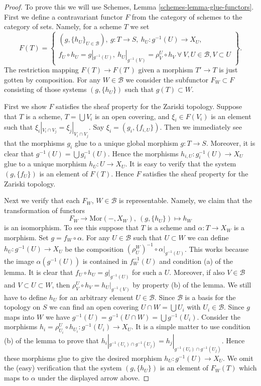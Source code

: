 \begin{proof}
To prove this we will use Schemes, Lemma \ref{schemes-lemma-glue-functors}.
First we define a contravariant functor $F$ from the category of schemes
to the category of sets. Namely, for a scheme $T$ we set
$$
F(T) =
\left\{
\begin{matrix}
(g, \{h_U\}_{U \in \mathcal{B}}), \ 
g : T \to S, \ h_U : g^{-1}(U) \to X_U, \\
f_U \circ h_U = g|_{g^{-1}(U)}, \ 
h_U|_{g^{-1}(V)} = \rho^U_V \circ h_V\ 
\forall\ V, U \in \mathcal{B}, V \subset U
\end{matrix}
\right\}.
$$
The restriction mapping $F(T) \to F(T')$ given a morphism
$T' \to T$ is just gotten by composition.
For any $W \in \mathcal{B}$ we consider the subfunctor
$F_W \subset F$ consisting of those systems $(g, \{h_U\})$
such that $g(T) \subset W$.

\medskip\noindent
First we show $F$ satisfies the sheaf property for the Zariski topology.
Suppose that $T$ is a scheme, $T = \bigcup V_i$ is an open covering,
and $\xi_i \in F(V_i)$ is an element such that
$\xi_i|_{V_i \cap V_j} = \xi_j|_{V_i \cap V_j}$.
Say $\xi_i = (g_i, \{f_{i, U}\})$. Then we immediately see that
the morphisms $g_i$ glue to a unique global morphism
$g : T \to S$. Moreover, it is clear that
$g^{-1}(U) = \bigcup g_i^{-1}(U)$. Hence the morphisms
$h_{i, U} : g_i^{-1}(U) \to X_U$ glue to a unique morphism
$h_U : U \to X_U$. It is easy to verify that the system
$(g, \{f_U\})$ is an element of $F(T)$. Hence $F$ satisfies the
sheaf property for the Zariski topology.

\medskip\noindent
Next we verify that each $F_W$, $W \in \mathcal{B}$ is representable.
Namely, we claim that the transformation of functors
$$
F_W \longrightarrow \text{Mor}(-, X_W), \ (g, \{h_U\}) \longmapsto h_W
$$
is an isomorphism. To see this suppose that $T$ is a scheme and
$\alpha : T \to X_W$ is a morphism. Set $g = f_W \circ \alpha$.
For any $U \in \mathcal{B}$ such that $U \subset W$ we can
define $h_U : g^{-1}(U) \to X_U$ be the composition
$(\rho^W_U)^{-1} \circ \alpha|_{g^{-1}(U)}$. This works because
the image $\alpha(g^{-1}(U))$ is contained in $f_W^{-1}(U)$ and
condition (a) of the lemma. It is clear that
$f_U \circ h_U = g|_{g^{-1}(U)}$ for such a $U$.
Moreover, if also $V \in \mathcal{B}$ and $V \subset U \subset W$,
then $\rho^U_V \circ h_V = h_U|_{g^{-1}(V)}$ by property (b)
of the lemma. We still have to define $h_U$ for an arbitrary
element $U \in \mathcal{B}$. Since $\mathcal{B}$ is a basis for
the topology on $S$ we can find an open covering
$U \cap W = \bigcup U_i$ with $U_i \in \mathcal{B}$. Since $g$ maps into $W$
we have
$g^{-1}(U) = g^{-1}(U \cap W) = \bigcup g^{-1}(U_i)$.
Consider the morphisms
$h_i = \rho^U_{U_i} \circ h_{U_i} : g^{-1}(U_i) \to X_U$.
It is a simple matter to use condition (b) of the lemma
to prove that
$h_i|_{g^{-1}(U_i) \cap g^{-1}(U_j)} = h_j|_{g^{-1}(U_i) \cap g^{-1}(U_j)}$.
Hence these morphisms glue to give the desired morphism
$h_U : g^{-1}(U) \to X_U$. We omit the (easy) verification that
the system $(g, \{h_U\})$ is an element of $F_W(T)$ which
maps to $\alpha$ under the displayed arrow above.


\end{proof}

